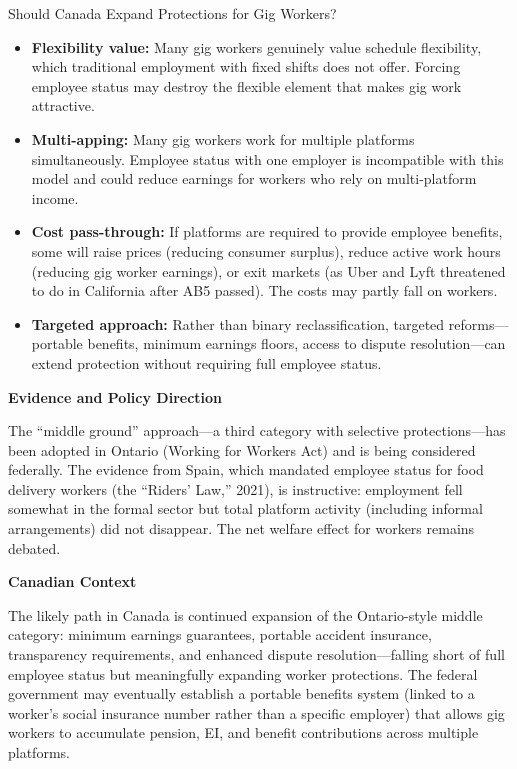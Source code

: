 \begin{policydebate}{Should Canada Expand Protections for Gig Workers?}
\begin{itemize}
  \item \textbf{Flexibility value:} Many gig workers genuinely value schedule flexibility, which traditional employment with fixed shifts does not offer. Forcing employee status may destroy the flexible element that makes gig work attractive.
  \item \textbf{Multi-apping:} Many gig workers work for multiple platforms simultaneously. Employee status with one employer is incompatible with this model and could reduce earnings for workers who rely on multi-platform income.
  \item \textbf{Cost pass-through:} If platforms are required to provide employee benefits, some will raise prices (reducing consumer surplus), reduce active work hours (reducing gig worker earnings), or exit markets (as Uber and Lyft threatened to do in California after AB5 passed). The costs may partly fall on workers.
  \item \textbf{Targeted approach:} Rather than binary reclassification, targeted reforms---portable benefits, minimum earnings floors, access to dispute resolution---can extend protection without requiring full employee status.
\end{itemize}

\textbf{Evidence and Policy Direction}

The ``middle ground'' approach---a third category with selective protections---has been adopted in Ontario (Working for Workers Act) and is being considered federally. The evidence from Spain, which mandated employee status for food delivery workers (the ``Riders' Law,'' 2021), is instructive: employment fell somewhat in the formal sector but total platform activity (including informal arrangements) did not disappear. The net welfare effect for workers remains debated.

\textbf{Canadian Context}

The likely path in Canada is continued expansion of the Ontario-style middle category: minimum earnings guarantees, portable accident insurance, transparency requirements, and enhanced dispute resolution---falling short of full employee status but meaningfully expanding worker protections. The federal government may eventually establish a portable benefits system (linked to a worker's social insurance number rather than a specific employer) that allows gig workers to accumulate pension, EI, and benefit contributions across multiple platforms.
\end{policydebate}

